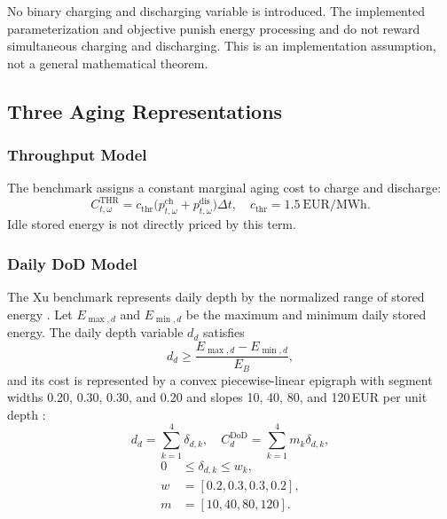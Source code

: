 \documentclass[journal,12pt,twocolumn]{IEEEtran}
\begin{document}
No binary charging and discharging variable is introduced. The implemented parameterization and objective punish energy processing and do not reward simultaneous charging and discharging. This is an implementation assumption, not a general mathematical theorem.

\subsection{Three Aging Representations}

\subsubsection{Throughput Model}
The benchmark assigns a constant marginal aging cost to charge and discharge:
\begin{equation}
C_{t,\omega}^{\text{THR}} = c_{\text{thr}} \bigl(p_{t,\omega}^{\text{ch}} + p_{t,\omega}^{\text{dis}}\bigr) \Delta t, \quad c_{\text{thr}} = 1.5~\text{EUR/MWh}.
\label{eq:throughput}
\end{equation}
Idle stored energy is not directly priced by this term.

\subsubsection{Daily DoD Model}
The Xu benchmark represents daily depth by the normalized range of stored energy \cite{Xu2018a}. Let $E_{\max,d}$ and $E_{\min,d}$ be the maximum and minimum daily stored energy. The daily depth variable $d_d$ satisfies
\begin{equation}
d_d \geq \frac{E_{\max,d} - E_{\min,d}}{E_B},
\label{eq:dod}
\end{equation}
and its cost is represented by a convex piecewise-linear epigraph with segment widths 0.20, 0.30, 0.30, and 0.20 and slopes 10, 40, 80, and 120\,EUR per unit depth \cite{Xu2018a}:
\begin{equation}
d_d = \sum_{k=1}^{4} \delta_{d,k}, \quad C_d^{\text{DoD}} = \sum_{k=1}^{4} m_k \delta_{d,k},
\label{eq:dod_cost}
\end{equation}
\begin{equation}
\begin{split}
0 &\leq \delta_{d,k} \leq w_k, \\
w &= [0.2, 0.3, 0.3, 0.2], \\
m &= [10, 40, 80, 120].
\end{split}
\label{eq:dod_segments}
\end{equation}
\end{document}
